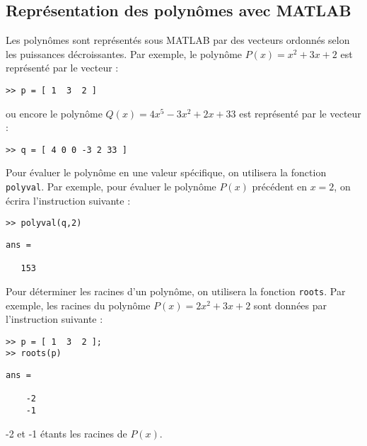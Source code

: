 \subsection{Représentation des polynômes avec MATLAB}
Les polynômes sont représentés sous MATLAB par des vecteurs ordonnés selon 
les puissances décroissantes.
Par exemple, le polynôme $P(x)=x^2+3x+2$ est représenté par le vecteur :
\begin{verbatim}
>> p = [ 1  3  2 ]
\end{verbatim}
ou encore le polynôme $Q(x)=4x^5−3x^2+2x+33$ est représenté par le vecteur :
\begin{verbatim}
>> q = [ 4 0 0 -3 2 33 ]
\end{verbatim}
Pour évaluer le polynôme en une valeur spécifique, on utilisera la fonction 
\texttt{polyval}. Par exemple, pour évaluer le polynôme $P(x)$ précédent en $x=2$,
on écrira l'instruction suivante :
\begin{verbatim}
>> polyval(q,2)
\end{verbatim}
\begin{verbatim}
ans =

   153
\end{verbatim}
Pour déterminer les racines d'un polynôme, on utilisera la fonction \texttt{roots}.
Par exemple, les racines du polynôme $P(x)=2x^2+3x+2$ sont données par l'instruction
suivante :
\begin{verbatim}
>> p = [ 1  3  2 ];
>> roots(p)
\end{verbatim}
\begin{verbatim}
ans =

    -2
    -1
\end{verbatim}
-2 et -1 étants les racines de $P(x)$.

